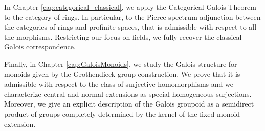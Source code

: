 \smallskip

In Chapter \ref{cap:categorical_classical}, we apply the Categorical Galois Theorem to the category of rings. In particular, to the Pierce spectrum adjunction between the categories of rings and profinite spaces, that is admissible with respect to all the morphisms. Restricting our focus on fields, we fully recover the classical Galois correspondence.

\smallskip

Finally, in Chapter \ref{cap:GaloisMonoids}, we study the Galois structure for monoids given by the Grothendieck group construction. We prove that it is admissible with respect to the class of surjective homomorphisms and we characterize central and normal extensions as special homogeneous surjections. Moreover, we give an explicit description of the Galois groupoid as a semidirect product of groups completely determined by the kernel of the fixed monoid extension.